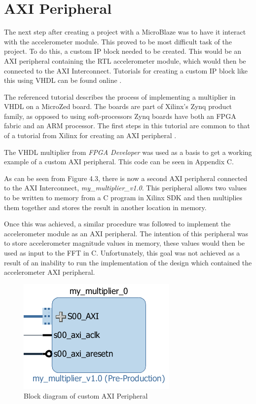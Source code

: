\documentclass[12pt,a4paper]{report} %
\begin{document}
\section{AXI Peripheral}
The next step after creating a project with a MicroBlaze was to have it interact with the accelerometer module.
This proved to be most difficult task of the project.
To do this, a custom IP block needed to be created.
This would be an AXI peripheral containing the RTL accelerometer module, which would then be connected to the AXI Interconnect.
Tutorials for creating a custom IP block like this using VHDL can be found online \cite{axiperiph}.

The referenced tutorial describes the process of implementing a multiplier in VHDL on a MicroZed board.
The boards are part of Xilinx’s Zynq product family, as opposed to using soft-processors Zynq boards have both an FPGA fabric and an ARM processor.
The first steps in this tutorial are common to that of a tutorial from Xilinx for creating an AXI peripheral \cite{xiaxi}.

The VHDL multiplier from \textit{FPGA Developer} was used as a basis to get a working example of a custom AXI peripheral.
This code can be seen in Appendix C.

As can be seen from Figure 4.3, there is now a second AXI peripheral connected to the AXI Interconnect, \textit{my\_multiplier\_v1.0}.
This peripheral allows two values to be written to memory from a C program in Xilinx SDK and then multiplies them together and stores the result in another location in memory.

Once this was achieved, a similar procedure was followed to implement the accelerometer module as an AXI peripheral.
The intention of this peripheral was to store accelerometer magnitude values in memory, these values would then be used as input to the FFT in C.
Unfortunately, this goal was not achieved as a result of an inability to run the implementation of the design which contained the accelerometer AXI peripheral.
\begin{figure}[h]
\centerline{\includegraphics[scale=1]{diagrams/image18}}
\caption{Block diagram of custom AXI Peripheral}
\end{figure}
\end{document}
